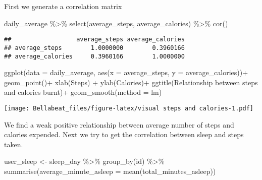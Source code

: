 \documentclass[
]{article}
\newenvironment{Shaded}{\begin{snugshade}}{\end{snugshade}}
\newcommand{\AttributeTok}[1]{\textcolor[rgb]{0.77,0.63,0.00}{#1}}
\newcommand{\FunctionTok}[1]{\textcolor[rgb]{0.00,0.00,0.00}{#1}}
\newcommand{\NormalTok}[1]{#1}
\newcommand{\OtherTok}[1]{\textcolor[rgb]{0.56,0.35,0.01}{#1}}
\newcommand{\SpecialCharTok}[1]{\textcolor[rgb]{0.00,0.00,0.00}{#1}}
\newcommand{\StringTok}[1]{\textcolor[rgb]{0.31,0.60,0.02}{#1}}
\begin{document}
First we generate a correlation matrix

\begin{Shaded}
\begin{Highlighting}[]
\NormalTok{daily\_average }\SpecialCharTok{\%\textgreater{}\%} 
  \FunctionTok{select}\NormalTok{(average\_steps, average\_calories) }\SpecialCharTok{\%\textgreater{}\%} 
  \FunctionTok{cor}\NormalTok{()}
\end{Highlighting}
\end{Shaded}

\begin{verbatim}
##                  average_steps average_calories
## average_steps        1.0000000        0.3960166
## average_calories     0.3960166        1.0000000
\end{verbatim}

\begin{Shaded}
\begin{Highlighting}[]
\FunctionTok{ggplot}\NormalTok{(}\AttributeTok{data =}\NormalTok{ daily\_average, }\FunctionTok{aes}\NormalTok{(}\AttributeTok{x =}\NormalTok{ average\_steps, }\AttributeTok{y =}\NormalTok{ average\_calories))}\SpecialCharTok{+}
         \FunctionTok{geom\_point}\NormalTok{()}\SpecialCharTok{+}
         \FunctionTok{xlab}\NormalTok{(}\StringTok{\textquotesingle{}Steps\textquotesingle{}}\NormalTok{) }\SpecialCharTok{+} \FunctionTok{ylab}\NormalTok{(}\StringTok{\textquotesingle{}Calories\textquotesingle{}}\NormalTok{)}\SpecialCharTok{+}
        \FunctionTok{ggtitle}\NormalTok{(}\StringTok{\textquotesingle{}Relationship between steps and calories burnt\textquotesingle{}}\NormalTok{)}\SpecialCharTok{+}
        \FunctionTok{geom\_smooth}\NormalTok{(}\AttributeTok{method =}\NormalTok{ lm)}
\end{Highlighting}
\end{Shaded}

\texttt{[image: Bellabeat\_files/figure-latex/visual steps and calories-1.pdf]}

We find a weak positive relationship between average number of steps and
calories expended. Next we try to get the correlation between sleep and
steps taken.

\begin{Shaded}
\begin{Highlighting}[]
\NormalTok{user\_sleep }\OtherTok{\textless{}{-}}\NormalTok{ sleep\_day }\SpecialCharTok{\%\textgreater{}\%} 
  \FunctionTok{group\_by}\NormalTok{(id) }\SpecialCharTok{\%\textgreater{}\%} 
  \FunctionTok{summarise}\NormalTok{(}\AttributeTok{average\_minute\_asleep =} \FunctionTok{mean}\NormalTok{(total\_minutes\_asleep))}
\end{Highlighting}
\end{Shaded}
\end{document}
